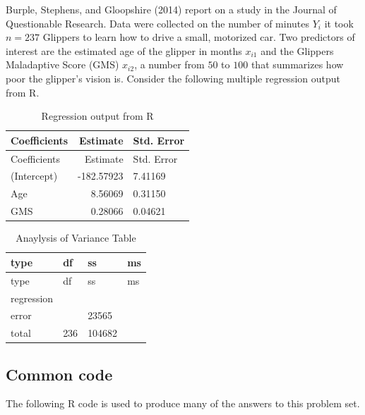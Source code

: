 \documentclass[
]{article}
\begin{document}
Burple, Stephens, and Gloopshire (2014) report on a study in the Journal
of Questionable Research. Data were collected on the number of minutes
\(Y_i\) it took \(n = 237\) Glippers to learn how to drive a small,
motorized car. Two predictors of interest are the estimated age of the
glipper in months \(x_{i 1}\) and the Glippers Maladaptive Score (GMS)
\(x_{i 2}\), a number from \(50\) to \(100\) that summarizes how poor
the glipper's vision is. Consider the following multiple regression
output from R.

\begin{longtable}[]{@{}lrl@{}}
\caption{Regression output from R}\tabularnewline
\toprule\noalign{}
Coefficients & Estimate & Std. Error \\
\midrule\noalign{}
\endfirsthead
\toprule\noalign{}
Coefficients & Estimate & Std. Error \\
\midrule\noalign{}
\endhead
\bottomrule\noalign{}
\endlastfoot
(Intercept) & -182.57923 & 7.41169 \\
Age & 8.56069 & 0.31150 \\
GMS & 0.28066 & 0.04621 \\
\end{longtable}

\begin{longtable}[]{@{}llll@{}}
\caption{Anaylysis of Variance Table}\tabularnewline
\toprule\noalign{}
type & df & ss & ms \\
\midrule\noalign{}
\endfirsthead
\toprule\noalign{}
type & df & ss & ms \\
\midrule\noalign{}
\endhead
\bottomrule\noalign{}
\endlastfoot
regression & & & \\
error & & 23565 & \\
total & 236 & 104682 & \\
\end{longtable}

\hypertarget{common-code}{%
\subsection{Common code}\label{common-code}}

The following R code is used to produce many of the answers to this
problem set.
\end{document}
